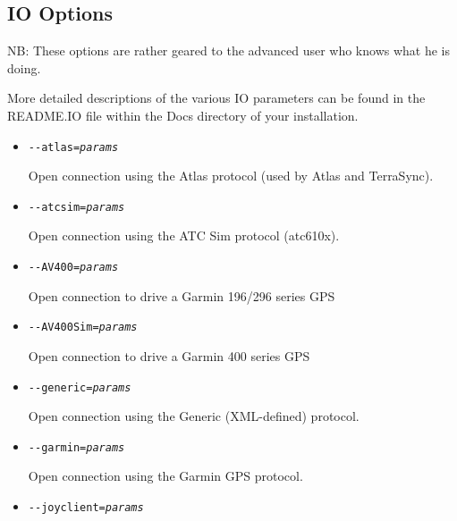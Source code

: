 \begin{itemize}
{\begin{itemize}
{ \item{\texttt{-$ $-rul={\it params}}}

  使用 RUL 协议打开连接。
  
  \end{itemize}
}
\fi
\iffalse
{
  \subsection{IO Options}

  NB: These options are rather geared to the advanced user who knows what he is doing.

  More detailed descriptions of the various IO parameters can be found in the README.IO file
  within the Docs directory of your \FlightGear{} installation.

  \begin{itemize}

  \item{\texttt{-$ $-atlas={\it params}}}

    Open connection using the Atlas protocol (used by Atlas and TerraSync).

  \item{\texttt{-$ $-atcsim={\it params}}}

    Open connection using the ATC Sim protocol (atc610x).

  \item{\texttt{-$ $-AV400={\it params}}}

    Open connection to drive a Garmin 196/296 series GPS

  \item{\texttt{-$ $-AV400Sim={\it params}}}

    Open connection to drive a Garmin 400 series GPS

  \item{\texttt{-$ $-generic={\it params}}}

    Open connection using the Generic (XML-defined) protocol.

  \item{\texttt{-$ $-garmin={\it params}}}

    Open connection using the Garmin GPS protocol.

  \item{\texttt{-$ $-joyclient={\it params}}}


\end{itemize}}
\end{itemize}

